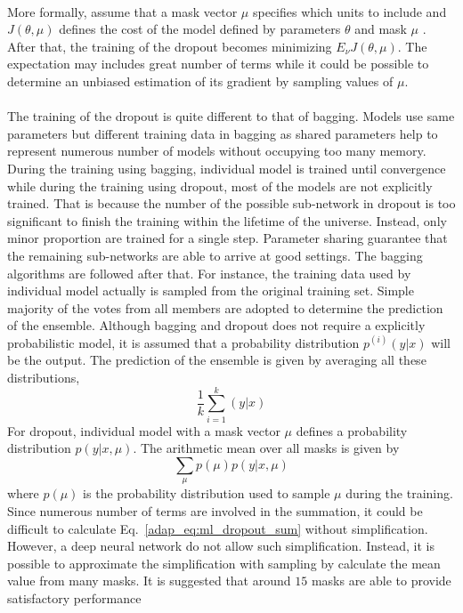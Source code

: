 \paragraph{}
More formally, assume that a mask vector $\mu$ specifies which units to include and $J(\theta,\mu)$ defines the cost of the model defined by parameters $\theta$ and mask $\mu$ \citep{Goodfellow-et-al-2016}.
After that, the training of the dropout becomes minimizing $E_\nu J(\theta,\mu)$.
The expectation may includes great number of terms while it could be possible to determine an unbiased estimation of its gradient by sampling values of $\mu$.

\paragraph{}
The training of the dropout is quite different to that of bagging.
Models use same parameters but different training data in bagging as shared parameters help to represent numerous number of models without occupying too many memory.
During the training using bagging, individual model is trained until convergence while during the training using dropout, most of the models are not explicitly trained.
That is because the number of the possible sub-network in dropout is too significant to finish the training within the lifetime of the universe.
Instead, only minor proportion are trained for a single step.
Parameter sharing guarantee that the remaining sub-networks are able to arrive at good settings.
The bagging algorithms are followed after that.
For instance, the training data used by individual model actually is sampled from the original training set.
Simple majority of the votes from all members are adopted to determine the prediction of the ensemble.
Although bagging and dropout does not require a explicitly probabilistic model, it is assumed that a probability distribution $p^{(i)}(y|x)$ will be the output.
The prediction of the ensemble is given by averaging all these distributions,
\begin{equation}
    \frac{1}{k} \sum_{i=1}^k (y|x)
\end{equation}
%
For dropout, individual model with a mask vector $\mu$ defines a probability distribution $p(y|x, \mu)$.
The arithmetic mean over all masks is given by
\begin{equation}
    \sum_\mu p(\mu) p(y|x, \mu)
    \label{adap_eq:ml_dropout_sum}
\end{equation}
%
where $p(\mu)$ is the probability distribution used to sample $\mu$ during the training.
Since numerous number of terms are involved in the summation, it could be difficult to calculate Eq.~\ref{adap_eq:ml_dropout_sum} without simplification.
However, a deep neural network do not allow such simplification.
Instead, it is possible to approximate the simplification with sampling by calculate the mean value from many masks.
It is suggested that around $15$ masks are able to provide satisfactory performance \citep{Goodfellow-et-al-2016}

